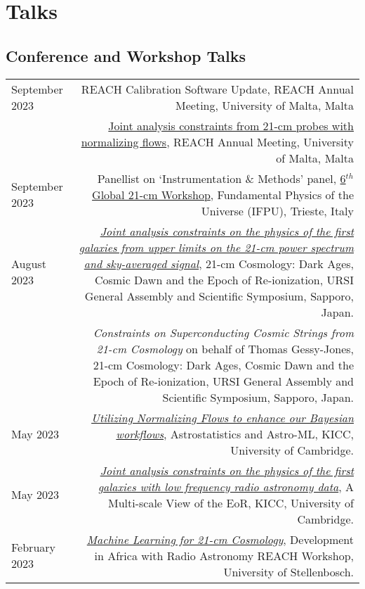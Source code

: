 \documentclass{article}
\begin{document}
\section*{Talks}
\subsection*{Conference and Workshop Talks}
\begin{tabular}{L!{\vrule}R}
    September 2023 & REACH Calibration Software Update, REACH Annual Meeting, University of Malta, Malta \\
    & \href{https://github.com/htjb/Talks/tree/master/Talks/REACH_Malta/joint_analysis_margarine.pdf}{Joint analysis constraints from 21-cm probes with normalizing flows}, REACH Annual Meeting, University of Malta, Malta \\
    September 2023 & Panellist on `Instrumentation \& Methods' panel, \href{https://global21cmworkshop.org/2023-ifpu/}{6$^{th}$ Global 21-cm Workshop}, Fundamental Physics of the Universe (IFPU), Trieste, Italy \\
    August 2023 & \href{https://github.com/htjb/Talks/raw/master/Talks/URSI_2023/joint_analysis_margarine.pdf}{\textit{Joint analysis constraints on the physics of the first galaxies from upper limits on the 21-cm power spectrum and sky-averaged signal}}, 21-cm Cosmology: Dark Ages, Cosmic Dawn and the Epoch of Re-ionization, URSI General Assembly and Scientific Symposium, Sapporo, Japan. \\
    & \textit{Constraints on Superconducting Cosmic Strings from 21-cm Cosmology} on behalf of Thomas Gessy-Jones, 21-cm Cosmology: Dark Ages, Cosmic Dawn and the Epoch of Re-ionization, URSI General Assembly and Scientific Symposium, Sapporo, Japan. \\
    May 2023 & \href{https://github.com/htjb/Talks/blob/master/Talks/KICC_EoR/Bevins_KICC_EoR.pdf}{\textit{Utilizing Normalizing Flows to enhance our Bayesian workflows}}, Astrostatistics and Astro-ML, KICC, University of Cambridge. \\
    May 2023 & \href{https://github.com/htjb/Talks/blob/master/Talks/KICC_EoR/Bevins_KICC_EoR.pdf}{\textit{Joint analysis constraints on the physics of the first galaxies with low frequency radio astronomy data}}, A Multi-scale View of the EoR, KICC, University of Cambridge. \\
    February 2023 & \href{https://github.com/htjb/Talks/blob/master/Talks/DARA_REACH_Workshop/DARA_Workshop.pdf}{\textit{Machine Learning for 21-cm Cosmology}}, Development in Africa with Radio Astronomy REACH Workshop, University of Stellenbosch. \\

\end{tabular}
\end{document}
